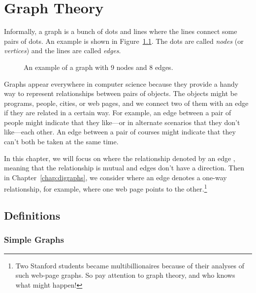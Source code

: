 \chapter{Graph Theory}\label{chap:graph_theory}

Informally, a graph is a bunch of dots and lines where the lines
connect some pairs of dots.  An example is shown in
Figure~\ref{fig:graph-example}.  The dots are called \emph{nodes} (or
\emph{vertices}) and the lines are called \emph{edges}.

\begin{figure}[h]


\caption{An example of a graph with 9 nodes and 8 edges.}

\label{fig:graph-example}

\end{figure}

Graphs appear everywhere in computer science because they provide a handy
way to represent relationships between pairs of objects.  The objects
might be programs, people, cities, or web pages, and we connect two of
them with an edge if they are related in a certain way.  For example, an
edge between a pair of people might indicate that they like---or in
alternate scenarios that they don't like---each other.  An edge between a
pair of courses might indicate that they can't both be taken at the same
time.

In this chapter, we will focus on \emph{} where the
relationship denoted by an edge \emph{}, meaning that the
relationship is mutual and edges don't have a direction.  Then in
Chapter~\ref{chap:digraphs}, we consider \emph{}
where an edge denotes a one-way relationship, for example, where one web
page points to the other.\footnote{Two Stanford students became
  multibillionaires because of their analyses of such web-page graphs.  So
  pay attention to graph theory, and who knows what might happen!}

\section{Definitions}\label{degreessec}

\subsection{Simple Graphs}

